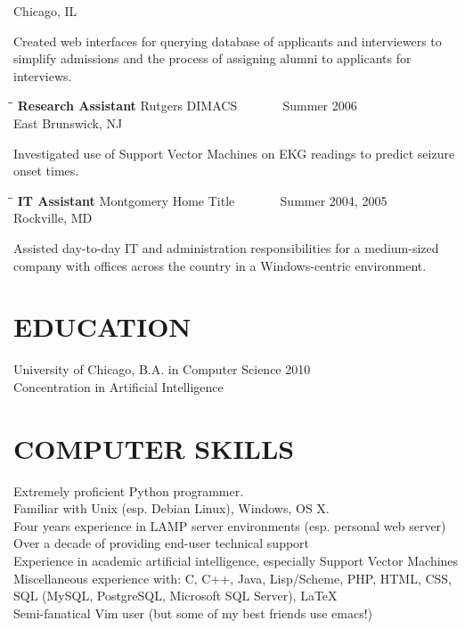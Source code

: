 \documentclass{res}
\begin{document}
\begin{resume}
\begin{tabbing}
                             \>Chicago, IL
   \end{tabbing}\vspace{-20pt}      %
   Created web interfaces for querying database of applicants and interviewers to simplify admissions and the process of assigning alumni to applicants for interviews.
   \begin{tabbing}%
   \hspace{2.3in}\= \hspace{2.6in}\= \kill %
   {\bf Research Assistant}  \>Rutgers DIMACS \> ~~~~~~ Summer 2006\\
                          \>East Brunswick, NJ
   \end{tabbing}\vspace{-20pt}
   Investigated use of Support Vector Machines on EKG readings to predict seizure onset times.
   \begin{tabbing}
   \hspace{2.3in}\= \hspace{2.6in}\= \kill %
    {\bf IT Assistant} \>Montgomery Home Title \> ~~~~~~ Summer 2004, 2005\\
                             \>Rockville, MD
   \end{tabbing}\vspace{-20pt}      %
   Assisted day-to-day IT and administration responsibilities for a medium-sized company with offices across the country in a Windows-centric environment. 


    
\section{EDUCATION}          
    University of Chicago, B.A. in Computer Science 2010  \\   
    Concentration in Artificial Intelligence      
 
    
\section{COMPUTER SKILLS}          
    Extremely proficient Python programmer. \\
    Familiar with Unix (esp. Debian Linux), Windows, OS X.\\
    Four years experience in LAMP server environments (esp. personal web server)\\
    Over a decade of providing end-user technical support \\
    Experience in academic artificial intelligence, especially Support Vector Machines \\
    Miscellaneous experience with: C, C++, Java, Lisp/Scheme, PHP, HTML, CSS, SQL (MySQL, PostgreSQL, Microsoft SQL Server), \LaTeX \\
    Semi-fanatical Vim user (but some of my best friends use emacs!)


\end{resume}
\end{document}
